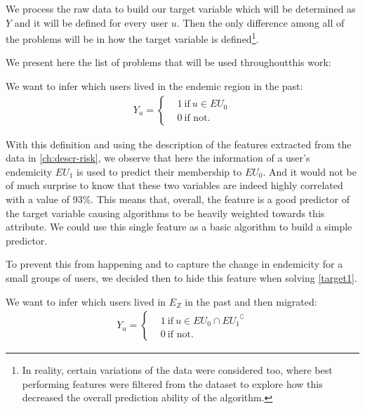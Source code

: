 We process the raw data to build our target variable which will be determined as $Y$ and it will be defined for every user $u$.
Then the only difference among all of the problems will be in how the target variable is defined\footnote{In reality, certain variations of the data were considered too, where best performing features were filtered from the dataset to explore how this decreased the overall prediction ability of the algorithm.}.


We present here the list of problems that will be used throughoutthis work:


\begin{problem}\label{target1}
We want to infer which users lived in the endemic region in the past:
		\begin{align*}
		Y_u =
		\begin{cases}
		&1 \ \mbox{if} \ u \in EU_{0} \\
		&0 \ \mbox{if not}.
		\end{cases}
		\end{align*}
\end{problem}

With this definition and using the description of the features extracted from the data in \cref{ch:descr-risk}, we observe that here the information of a user's endemicity $EU_{1}$ is used to predict their membership to $EU_{0}$.
And it would not be of much surprise to know that these two variables are indeed highly correlated with a value of 93\%.
This means that, overall, the feature is a good predictor of the target variable causing algorithms to be heavily weighted towards this attribute.
We could use this single feature as a basic algorithm to build a simple predictor.

To prevent this from happening and to capture the change in endemicity for a small groups of users, we decided then to hide this feature when solving \cref{target1}.



\begin{problem}\label{target2}
We want to infer which users lived in $E_Z$ in the past and then migrated:
	\begin{align*}
				Y_u =
				\begin{cases}
					&1 \ \mbox{if} \ u \in EU_{0} \cap { EU_{1} }^{\complement}  \\
					&0 \ \mbox{if not}.
				\end{cases}
			\end{align*}
\end{problem}

